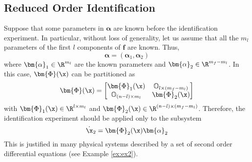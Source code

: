 \subsection{Reduced Order Identification}
Suppose that some parameters in $\bm{\alpha}$ are known before the identification experiment. In particular, without loss of generality, let us assume that all the $m_l$ parameters of the first $l$ components of $\mathbf{f}$ are known. Thus,
%
\begin{equation}
    \bm{\alpha} = \left(\bm{\alpha}_1,\bm{\alpha}_2\right)
\end{equation}
%
where $\bm{\alpha}_1\in\R^{m_l}$ are the known parameters and $\bm{\alpha}_2\in\R^{m_f-m_l}$. In this case, $\bm{\Phi}(\x)$ can be partitioned as
%
\begin{equation}
    \bm{\Phi}(\x) = \begin{bmatrix}\bm{\Phi}_1(\x)&\mathbb{O}_{l\times (m_f-m_l)}\\\mathbb{O}_{(n-l)\times m_l}&\bm{\Phi}_2(\x)\end{bmatrix}
\end{equation}
%
with $\bm{\Phi}_1(\x)\in\R^{l\times m_l}$ and $\bm{\Phi}_2(\x)\in\R^{(n-l)\times (m_f-m_l)}$.
Therefore, the identification experiment should be applied only to the subsystem
\begin{equation}\label{eq:redflow}
\dot{\x}_2=\bm{\Phi}_2(\x)\bm{\alpha}_2
\end{equation}
This is justified in many physical systems described by a set of second order differential equations (see Example \ref{ex:ex2}).

